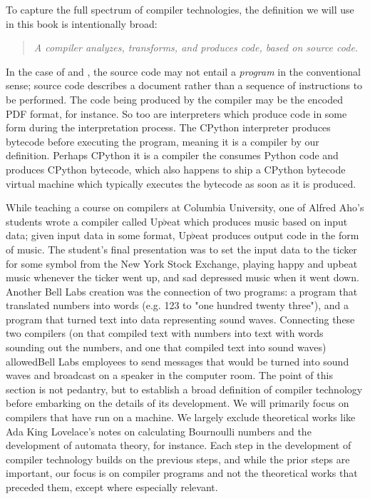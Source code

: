 \vspace{0.5em}

To capture the full spectrum of compiler technologies, the 
definition we will use in this book is intentionally broad:
\begin{quotation}
\textit{A compiler analyzes, transforms, and produces code, based on source code.}
\label{def:compiler}
\end{quotation}

In the case of \tex and \metafont, the source code may not entail a 
\textit{program} in the conventional sense; \tex source code describes a 
document rather than a sequence of instructions to be performed. The code being 
produced by the compiler may be the encoded PDF format, for instance. So too are 
interpreters which produce code in some form during the interpretation 
process. The CPython interpreter produces bytecode before executing the 
program, meaning it is a compiler by our definition. Perhaps CPython it is a 
compiler the consumes Python code and produces CPython bytecode, which also 
happens to ship a CPython bytecode virtual machine which typically executes the 
bytecode as soon as it is produced. 

While teaching a course on compilers at 
Columbia University, one of Alfred Aho's students wrote a compiler called 
Up$\flat$eat which produces music based on input data; given input data in some 
format, Up$\flat$eat produces output code in the form of 
music\cite{aho_oral_history_2022}. The student's final presentation was to set 
the input data to the ticker for some symbol from the New York Stock Exchange, 
playing happy and upbeat music whenever the ticker went up, and sad depressed 
music when it went down. Another Bell Labs creation was the connection of two 
programs: a program that translated numbers into words (e.g. 123 to "one 
hundred twenty three"), and a program that turned text into data representing 
sound waves. Connecting these two compilers (on that compiled text with numbers 
into text with words sounding out the numbers, and one that compiled text into 
sound waves) allowedBell Labs employees to send messages that would be turned 
into sound waves and broadcast on a speaker in the computer room. The point of 
this section is not pedantry, but to establish a broad definition of compiler 
technology before embarking on the details of its development. We will primarily 
focus on compilers that have run on a machine. We largely exclude theoretical 
works like Ada King Lovelace's notes on calculating Bournoulli numbers and the 
development of automata theory, for instance. Each step in the development of 
compiler technology builds on the previous steps, and while the prior steps are 
important, our focus is on compiler programs and not the theoretical works that 
preceded them, except where especially relevant.
